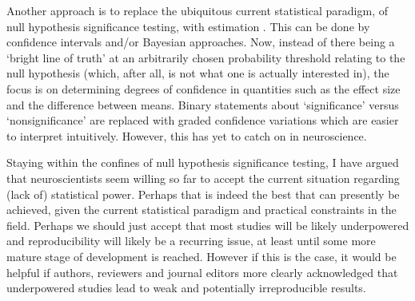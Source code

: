 \documentclass[a4paper,11pt]{article}
\begin{document}
Another approach is to replace the ubiquitous current statistical
paradigm, of null hypothesis significance testing, with estimation
\cite{cumming17}. This can be done by confidence intervals and/or
Bayesian approaches. Now, instead of there being a `bright line of
truth' at an arbitrarily chosen probability threshold relating to the
null hypothesis (which, after all, is not what one is actually
interested in), the focus is on determining degrees of confidence in
quantities such as the effect size and the difference between
means. Binary statements about `significance' versus `nonsignificance'
are replaced with graded confidence variations which are easier to
interpret intuitively. However, this has yet to catch on in
neuroscience.

Staying within the confines of null hypothesis significance testing, I
have argued that neuroscientists seem willing so far to accept the
current situation regarding (lack of) statistical power. Perhaps that
is indeed the best that can presently be achieved, given the current
statistical paradigm and practical constraints in the field. Perhaps
we should just accept that most studies will be likely underpowered
and reproducibility will likely be a recurring issue, at least until
some more mature stage of development is reached. However if this is
the case, it would be helpful if authors, reviewers and journal
editors more clearly acknowledged that underpowered studies lead to
weak and potentially irreproducible results.

\newpage
\end{document}
